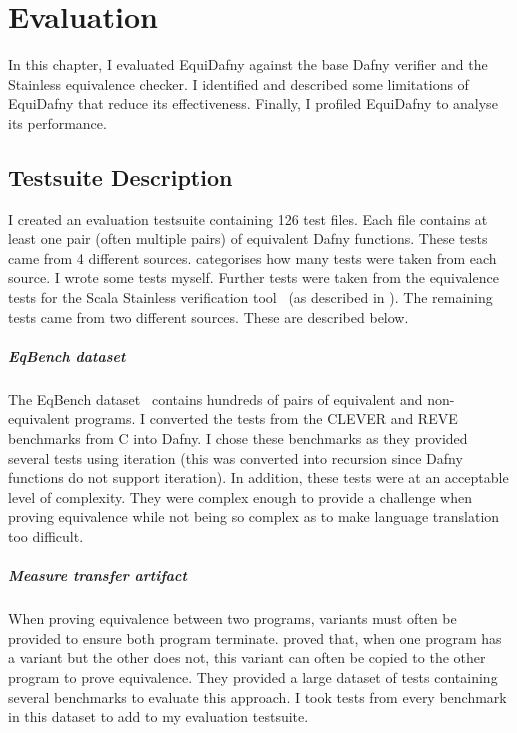 \chapter{Evaluation}\label{chp:evaluation}

In this chapter, I evaluated EquiDafny against the base Dafny verifier and the Stainless equivalence checker. I identified and described some limitations of EquiDafny that reduce its effectiveness. Finally, I profiled EquiDafny to analyse its performance.

\section{Testsuite Description}

I created an evaluation testsuite containing 126 test files. Each file contains at least one pair (often multiple pairs) of equivalent Dafny functions. These tests came from 4 different sources.  categorises how many tests were taken from each source. I wrote some tests myself. Further tests were taken from the equivalence tests for the Scala Stainless verification tool~\parencite{StainlessFrontendsBenchmarks} (as described in ). The remaining tests came from two different sources. These are described below.

\paragraph{EqBench dataset} The EqBench dataset~\parencite{badihiEqBenchDatasetEquivalent2021} contains hundreds of pairs of equivalent and non-equivalent programs. I converted the tests from the CLEVER and REVE benchmarks from C into Dafny. I chose these benchmarks as they provided several tests using iteration (this was converted into recursion since Dafny functions do not support iteration). In addition, these tests were at an acceptable level of complexity. They were complex enough to provide a challenge when proving equivalence while not being so complex as to make language translation too difficult. 

\paragraph{Measure transfer artifact} When proving equivalence between two programs, variants must often be provided to ensure both program terminate. \textcite{milovancevicProvingTerminationMeasure2025} proved that, when one program has a variant but the other does not, this variant can often be copied to the other program to prove equivalence. They provided a large dataset of tests containing several benchmarks to evaluate this approach. I took tests from every benchmark in this dataset to add to my evaluation testsuite.

